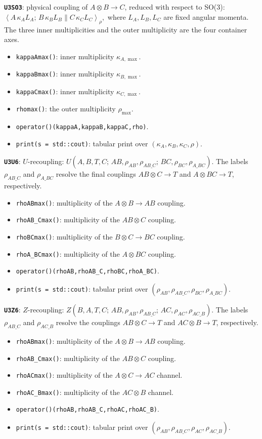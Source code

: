 \documentclass[aps,onecolumn,10pt,superscriptaddress,floatfix,nofootinbib]{revtex4}
\begin{document}
\textbf{\texttt{U3SO3}}: physical coupling of $A\otimes B\to C$, reduced with
respect to SO(3):
$
  \left\langle A\,\kappa_A L_A;\,B\,\kappa_B L_B
  \middle\| C\,\kappa_C L_C\right\rangle_{\rho},
$
where $L_A,L_B,L_C$ are fixed angular momenta. The three inner multiplicities and the outer
multiplicity are the four container axes.
\begin{itemize}
    \item \verb|kappaAmax()|: inner multiplicity $\kappa_{A,\max}$.
    \item \verb|kappaBmax()|: inner multiplicity $\kappa_{B,\max}$.
    \item \verb|kappaCmax()|: inner multiplicity $\kappa_{C,\max}$.
    \item \verb|rhomax()|: the outer multiplicity $\rho_{\max}$.
    \item \verb|operator()(kappaA,kappaB,kappaC,rho)|.
    \item \verb|print(s = std::cout)|: tabular print over $(\kappa_A,\kappa_B,\kappa_C,\rho)$.
\end{itemize}

\textbf{\texttt{U3U6}}: $U$-recoupling:
$
 U\!\left(A,B,T,C;\,AB,\rho_{AB},\rho_{AB\_C};\,
 BC,\rho_{BC},\rho_{A\_BC}\right).
$
The labels $\rho_{AB\_C}$ and $\rho_{A\_BC}$ resolve the final couplings
$AB\otimes C\to T$ and $A\otimes BC\to T$, respectively.
\begin{itemize}
    \item \verb|rhoABmax()|: multiplicity of the $A\otimes B\to AB$ coupling.
    \item \verb|rhoAB_Cmax()|: multiplicity of the $AB\otimes C$ coupling.
    \item \verb|rhoBCmax()|: multiplicity of the $B\otimes C\to BC$ coupling.
    \item \verb|rhoA_BCmax()|: multiplicity of the $A\otimes BC$ coupling.
    \item \verb|operator()(rhoAB,rhoAB_C,rhoBC,rhoA_BC)|.
    \item \verb|print(s = std::cout)|: tabular print over $(\rho_{AB},\rho_{AB\_C},\rho_{BC},\rho_{A\_BC})$.
\end{itemize}

\textbf{\texttt{U3Z6}}: $Z$-recoupling:
$
 Z\!\left(B,A,T,C;\,AB,\rho_{AB},\rho_{AB\_C};\,
 AC,\rho_{AC},\rho_{AC\_B}\right).
$
The labels $\rho_{AB\_C}$ and $\rho_{AC\_B}$ resolve the couplings $AB\otimes C\to T$
and $AC\otimes B\to T$, respectively. 
\begin{itemize}
    \item \verb|rhoABmax()|: multiplicity of the $A\otimes B\to AB$ coupling.
    \item \verb|rhoAB_Cmax()|: multiplicity of the $AB\otimes C$ coupling.
    \item \verb|rhoACmax()|: multiplicity of the $A\otimes C\to AC$ channel.
    \item \verb|rhoAC_Bmax()|: multiplicity of the $AC\otimes B$ channel.
    \item \verb|operator()(rhoAB,rhoAB_C,rhoAC,rhoAC_B)|.
    \item \verb|print(s = std::cout)|: tabular print over $(\rho_{AB},\rho_{AB\_C},\rho_{AC},\rho_{AC\_B})$.
\end{itemize}
\end{document}
